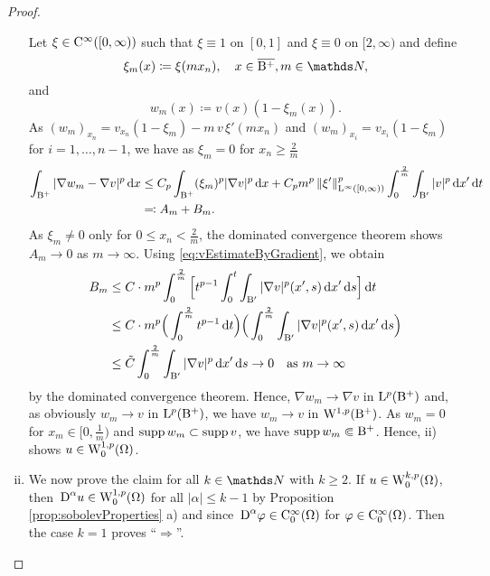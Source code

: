 \begin{proof}
\begin{enumerate}[i)]
    Let $\xi \in \mathrm{C}^\infty([0,\infty))$ such that $\xi \equiv 1$ on $[0,1]$ and $\xi \equiv 0$ on $[2,\infty)$ and define 
      $$\xi_m (x) \coloneqq \xi(mx_n), \quad x \in \overline{\BB^+}, m \in \N,$$ and 
      $$w_m(x) \coloneqq v(x)(1 - \xi_m(x)).$$
      As $(w_m)_{x_n} = v_{x_n}(1 - \xi_m) - m\, v\, \xi'(m x_n)$ and $(w_m)_{x_i} = v_{x_i}(1 - \xi_m)$ for $i = 1,\dots,n-1$, we have as $\xi_m =0$ for $x_n \geq \frac{2}{m}$
      \begin{align*}
      \int_{\mathrm{B}^+} |\nabla w_m - \nabla v|^p \, {\operatorname{d}\!{x}}
      &\leq C_p \int_{\mathrm{B}^+} (\xi_m)^p |\nabla v|^p \, {\operatorname{d}\!{x}} + C_p m^p\, \|\xi'\|_{\mathrm{L}^\infty([0,\infty))}^p \int_0^{\frac{2}{m}} \int_{\mathrm{B}'} |v|^p \, {\operatorname{d}\!{x}}' \, {\operatorname{d}\!{t}} \\
        &\eqqcolon A_m + B_m.
      \end{align*}
      As $\xi_m \neq 0$ only for $0 \leq x_n < \frac{2}{m}$, the dominated convergence theorem shows $A_m \to 0$ as $m \to \infty$.
      Using \eqref{eq:vEstimateByGradient}, we obtain
      \begin{align*}
      B_m 
      &\leq C \cdot m^p  \int_0^{\frac{2}{m}}\Big[ t^{p - 1} \int_0^{t} \int_{\BB'} |\nabla v|^p(x',s) \d x' \d s \Big] \d t \\
      &\leq C \cdot m^p \Big( \int_0^{\frac{2}{m}} t^{p - 1} \d t \Big) \Big( \int_0^{\frac{2}{m}} \int_{\BB'} |\nabla v|^p(x',s) \d x' \d s \Big) \\
      &\leq \tilde C \int_0^{\frac{2}{m}} \int_{\BB'} |\nabla v|^p \d x' \d s \to 0 \quad\text{as } m \to \infty 
      \end{align*}
      by the dominated convergence theorem.
      Hence, $\nabla w_m \to \nabla v$ in $\mathrm{L}^p(\mathrm{B}^+)$ and, as obviously $w_m \to v$ in $\mathrm{L}^p(\mathrm{B}^+)$, we have $w_m \to v$ in $\mathrm{W}^{1,p}(\mathrm{B}^+)$.
      As $w_m = 0$ for $x_m \in [0,\frac{1}{m})$ and $\operatorname{supp} w_m \subset \operatorname{supp} v$, we have $\operatorname{supp} w_m \Subset \mathrm{B}^+$.
        Hence, ii) shows $u \in \mathrm{W}_0^{1,p}(\Omega)$.

      \item We now prove the claim for all $k \in \N$ with $k \geq 2$.
        If $u \in \mathrm{W}_0^{k,p}(\Omega)$, then $\,{\operatorname{D}}^\alpha u \in \mathrm{W}_0^{1,p}(\Omega)$ for all $|\alpha| \leq k -1$ by Proposition \ref{prop:sobolevProperties} a) and since $\,{\operatorname{D}}^\alpha \varphi \in \mathrm{C}_0^\infty(\Omega)$ for $\varphi \in \mathrm{C}_0^\infty(\Omega)$.
        Then the case $k = 1$ proves ``$\Rightarrow$''.


\end{enumerate}
\end{proof}
